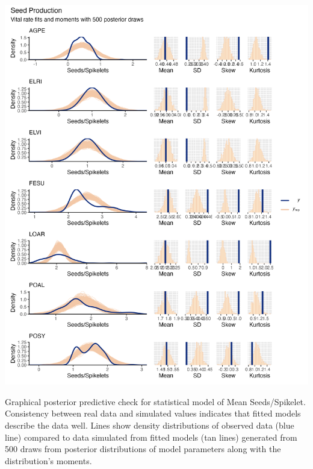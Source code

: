 \documentclass[lineno, sn-basic]{sn-jnl}%
\providecommand{\DIFadd}[1]{{\protect\color{blue}#1}} %
\providecommand{\DIFadd}[1]{{\protect\color{blue}\uwave{#1}}} %
\providecommand{\DIFaddFL}[1]{\DIFadd{#1}} %
\begin{document}
\begin{myfigure}[H]
	\centering
	\includegraphics[width = \linewidth]{seedmeanbyspecies_densplot.png}
	\caption[Graphical posterior predictive check for statistical model of Mean Seeds/Spikelet]{\DIFaddFL{Graphical posterior predictive check for statistical model of Mean Seeds/Spikelet. Consistency between real data and simulated values indicates that fitted models describe the data well. Lines show density distributions of observed data (blue line) compared to data simulated from fitted models (tan lines) generated from 500 draws from posterior distributions of model parameters along with the distribution's moments.}}
\end{myfigure}
\end{document}
